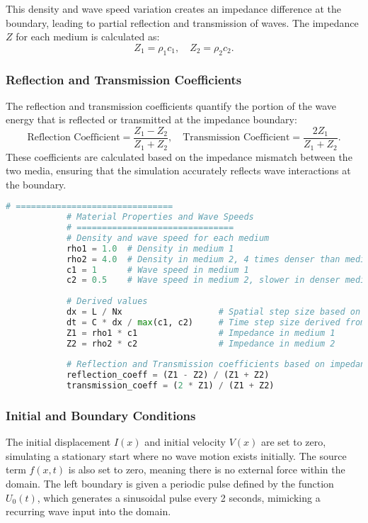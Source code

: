 \documentclass{article}
\begin{document}
		This density and wave speed variation creates an impedance difference at the boundary, leading to partial reflection and transmission of waves. The impedance \( Z \) for each medium is calculated as:
		\[
		Z_1 = \rho_1 c_1, \quad Z_2 = \rho_2 c_2.
		\]
		
		\subsubsection{Reflection and Transmission Coefficients}
		
		The reflection and transmission coefficients quantify the portion of the wave energy that is reflected or transmitted at the impedance boundary:
		\[
		\text{Reflection Coefficient} = \frac{Z_1 - Z_2}{Z_1 + Z_2}, \quad \text{Transmission Coefficient} = \frac{2 Z_1}{Z_1 + Z_2}.
		\]
		These coefficients are calculated based on the impedance mismatch between the two media, ensuring that the simulation accurately reflects wave interactions at the boundary.
		
		\begin{lstlisting}[language=Python]
			# ===============================
			# Material Properties and Wave Speeds
			# ===============================
			# Density and wave speed for each medium
			rho1 = 1.0  # Density in medium 1
			rho2 = 4.0  # Density in medium 2, 4 times denser than medium 1
			c1 = 1      # Wave speed in medium 1
			c2 = 0.5    # Wave speed in medium 2, slower in denser medium
			
			# Derived values
			dx = L / Nx                   # Spatial step size based on the number of points
			dt = C * dx / max(c1, c2)     # Time step size derived from the Courant number for stability
			Z1 = rho1 * c1                # Impedance in medium 1
			Z2 = rho2 * c2                # Impedance in medium 2
			
			# Reflection and Transmission coefficients based on impedance mismatch
			reflection_coeff = (Z1 - Z2) / (Z1 + Z2)
			transmission_coeff = (2 * Z1) / (Z1 + Z2)
		\end{lstlisting}
		
		
		\subsubsection{Initial and Boundary Conditions}
		
		The initial displacement \( I(x) \) and initial velocity \( V(x) \) are set to zero, simulating a stationary start where no wave motion exists initially. The source term \( f(x, t) \) is also set to zero, meaning there is no external force within the domain. The left boundary is given a periodic pulse defined by the function \( U_0(t) \), which generates a sinusoidal pulse every 2 seconds, mimicking a recurring wave input into the domain.
		
\end{document}
